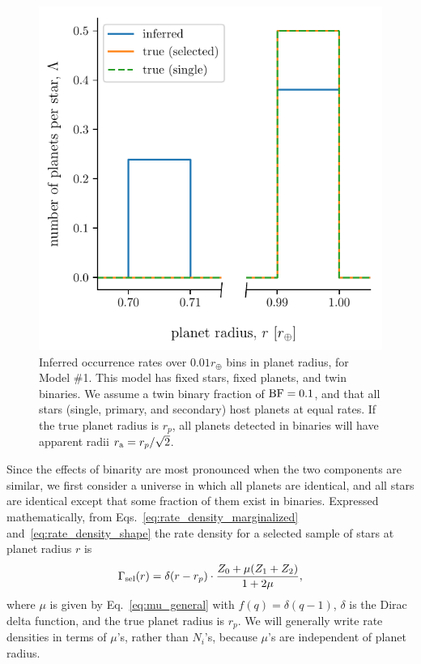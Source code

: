 \documentclass[12pt,modern]{aastex61}
\renewcommand{\a}{_{\rm a}}
\begin{document}
\begin{figure}[!tb]
    \begin{center}
        \includegraphics[width=.6\textwidth]{figures/occ_rate_vs_radius_model_1_brokenx.pdf}
    \end{center}
    \vspace{-0.5cm}
    \caption{
        Inferred occurrence rates over $0.01r_\oplus$ bins in planet 
        radius, for Model \#1.
        This model has fixed stars, fixed planets, and twin binaries. 
        We assume a twin binary fraction of ${\rm BF}=0.1$, and that all 
        stars (single, primary, and secondary) host planets at equal 
        rates.
        If the true planet radius is $r_p$, all planets detected in binaries 
        will have apparent radii $r\a = r_p/\sqrt{2}$.
    }
    \label{fig:occ_rate_model_1}
\end{figure}

Since the effects of binarity are most pronounced when the two components are 
similar, we first consider a universe in which all planets are 
identical, and all stars are identical except that some fraction of them exist 
in binaries.
Expressed mathematically, from Eqs.~\ref{eq:rate_density_marginalized} 
and~\ref{eq:rate_density_shape} the rate density for a selected sample of 
stars at planet radius $r$ is
\begin{equation}
\Gamma_{\rm sel}(r) = \delta(r-r_p) \cdot
\frac{
    Z_0 +
    \mu (Z_1 + Z_2)
}{1+2\mu},
\label{eq:model_1_rate_density}
\end{equation}
where $\mu$ is given by Eq.~\ref{eq:mu_general} with $f(q) = \delta(q-1)$,
$\delta$ is the Dirac delta function, and the true planet radius is 
$r_p$.
We will generally write rate densities in terms of $\mu$'s, rather than 
$N_i$'s, because $\mu$'s are independent of planet radius.
\end{document}

